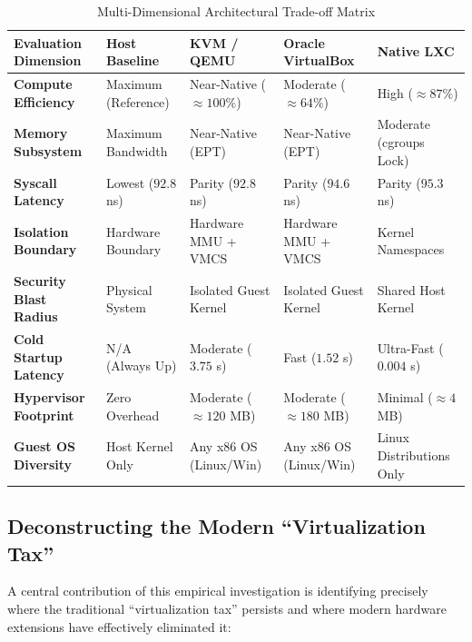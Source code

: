 \begin{table}[t]
\centering
\small
\caption{Multi-Dimensional Architectural Trade-off Matrix}
\label{tab:tradeoff_matrix}
\begin{tabularx}{\textwidth}{>{\raggedright\arraybackslash}p{3.2cm}>{\raggedright\arraybackslash}X>{\raggedright\arraybackslash}X>{\raggedright\arraybackslash}X>{\raggedright\arraybackslash}X}
\toprule
\textbf{Evaluation Dimension} & \textbf{Host Baseline} & \textbf{KVM / QEMU} & \textbf{Oracle VirtualBox} & \textbf{Native LXC} \\
\midrule
\textbf{Compute Efficiency} & Maximum (Reference) & Near-Native ($\approx 100\%$) & Moderate ($\approx 64\%$) & High ($\approx 87\%$) \\
\textbf{Memory Subsystem} & Maximum Bandwidth & Near-Native (EPT) & Near-Native (EPT) & Moderate (cgroups Lock) \\
\textbf{Syscall Latency} & Lowest ($92.8$ ns) & Parity ($92.8$ ns) & Parity ($94.6$ ns) & Parity ($95.3$ ns) \\
\textbf{Isolation Boundary} & Hardware Boundary & Hardware MMU + VMCS & Hardware MMU + VMCS & Kernel Namespaces \\
\textbf{Security Blast Radius} & Physical System & Isolated Guest Kernel & Isolated Guest Kernel & Shared Host Kernel \\
\textbf{Cold Startup Latency} & N/A (Always Up) & Moderate ($3.75$ s) & Fast ($1.52$ s) & Ultra-Fast ($0.004$ s) \\
\textbf{Hypervisor Footprint} & Zero Overhead & Moderate ($\approx 120$ MB) & Moderate ($\approx 180$ MB) & Minimal ($\approx 4$ MB) \\
\textbf{Guest OS Diversity} & Host Kernel Only & Any x86 OS (Linux/Win) & Any x86 OS (Linux/Win) & Linux Distributions Only \\
\bottomrule
\end{tabularx}
\end{table}

\subsection{Deconstructing the Modern ``Virtualization Tax''}
\label{subsec:deconstructing_tax}

A central contribution of this empirical investigation is identifying precisely where the traditional ``virtualization tax'' persists and where modern hardware extensions have effectively eliminated it:

